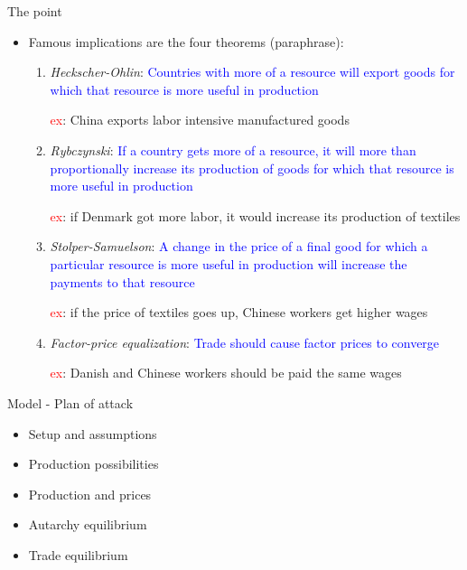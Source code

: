 \documentclass[ignorenonframetext,]{beamer}
\begin{document}
\begin{frame}{The point}

    \begin{itemize}
        \item Famous implications are the four theorems (paraphrase):
        \begin{enumerate}
            \item \emph{Heckscher-Ohlin}: \textcolor{blue}{Countries with more of a resource will export goods for which that resource is more useful in production} 

\textcolor{red}{ex}: China exports labor intensive manufactured goods
            \item \emph{Rybczynski}: \textcolor{blue}{If a country gets more of a resource, it will more than proportionally increase its production of goods for which that resource is more useful in production}

\textcolor{red}{ex}: if Denmark got more labor, it would increase its production of textiles
            \item \emph{Stolper-Samuelson}: \textcolor{blue}{A change in the price of a final good for which a particular resource is more useful in production will increase the payments to that resource}

\textcolor{red}{ex}: if the price of textiles goes up, Chinese workers get higher wages
            \item \emph{Factor-price equalization}: \textcolor{blue}{Trade should cause factor prices to converge}

\textcolor{red}{ex}: Danish and Chinese workers should be paid the same wages
        \end{enumerate}
    \end{itemize}

\end{frame}

\begin{frame}{Model - Plan of attack}

        \begin{itemize}
            \item Setup and assumptions
            \item Production possibilities
            \item Production and prices
            \item Autarchy equilibrium
            \item Trade equilibrium
        \end{itemize}

\end{frame}
\end{document}
